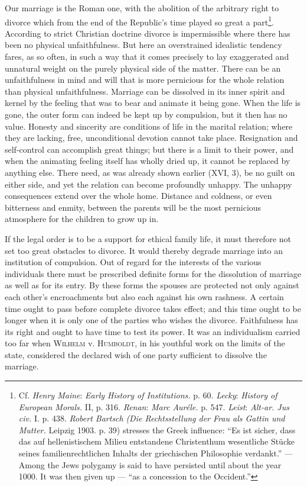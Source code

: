 \documentclass[12pt,a4paper,openany]{book}
\newcommand{\opage}[1]{\marginnote{\footnotesize\textit{[#1]}}}
\begin{document}
Our marriage is the Roman one, with the abolition of the arbitrary right to divorce which from the end of the
Republic's time played so great a part\footnote[2]{Cf. \emph{Henry Maine}: \textit{Early History of Institutions.}
p. 60. \emph{Lecky}: \textit{History of European Morals.} II, p. 316. \emph{Renan}: \textit{Marc Auréle.} %
p. 547.
\emph{Leist}: \textit{Alt-ar. Jus civ.} I. p. 438. \emph{Robert Bartsch} \textit{(Die Rechtsstellung der Frau als Gattin
und Mutter.} Leipzig 1903. p. 39) stresses the Greek influence: ``Es ist sicher, dass das auf hellenistischem Milieu
entstandene Christenthum wesentliche Stücke seines familienrechtlichen Inhalts der griechischen Philosophie verdankt.''
--- Among the Jews polygamy is said to have persisted until about the year 1000. It was then given up --- ``as a
concession to the Occident.''}. According to strict Christian doctrine divorce is impermissible where there has been no
physical unfaithfulness. But here an overstrained idealistic tendency fares, as so often, in such a way that it comes
precisely to lay exaggerated and unnatural weight on the purely physical side of the matter. There can be an
unfaithfulness in mind and will that is more pernicious for the whole relation than physical unfaithfulness. Marriage can
be dissolved in its inner spirit and kernel by the feeling that was to bear and animate it being gone. When the life is
gone, the outer form can indeed be kept up by compulsion, but it then has no value. Honesty and sincerity are conditions
of life in the marital relation; where they are lacking, free, unconditional devotion cannot take place. Resignation and
self-control can accomplish great things; but there is a limit to their power, and when the animating feeling itself has
wholly dried up, it cannot be replaced by anything else. There need, as was already shown earlier
\opage{309}(XVI, 3), be no guilt on either side, and yet the relation can become profoundly unhappy. The unhappy
consequences extend over the whole home. Distance and coldness, or even bitterness and enmity, between the parents will be
the most pernicious atmosphere for the children to grow up in.

If the legal order is to be a support for ethical family life, it must therefore not set too great obstacles to divorce.
It would thereby degrade marriage into an institution of compulsion. Out of regard for the interests of the various
individuals there must be prescribed definite forms for the dissolution of marriage as well as for its entry. By these
forms the spouses are protected not only against each other's encroachments but also each against his own rashness. A
certain time ought to pass before complete divorce takes effect; and this time ought to be longer when it is only one of
the parties who wishes the divorce. Faithfulness has its right and ought to have time to test its power. It was an
individualism carried too far when \textsc{Wilhelm} v. \textsc{Humboldt}, in his youthful work on the limits of the
state, considered the declared wish of one party sufficient to dissolve the marriage.
\end{document}
